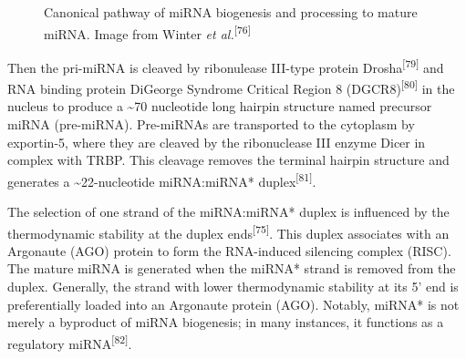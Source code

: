 \documentclass[
  11pt,
  letterpaper,
]{book}
\begin{document}
\begin{figure}[H]


\caption{\label{fig-winter2009many}Canonical pathway of miRNA biogenesis
and processing to mature miRNA. Image from Winter \emph{et
al.}\textsuperscript{{[}76{]}}}

\end{figure}%

Then the pri-miRNA is cleaved by ribonulease III-type protein
Drosha\textsuperscript{{[}79{]}} and RNA binding protein DiGeorge
Syndrome Critical Region 8 (DGCR8)\textsuperscript{{[}80{]}} in the
nucleus to produce a \textasciitilde70 nucleotide long hairpin structure
named precursor miRNA (pre-miRNA). Pre-miRNAs are transported to the
cytoplasm by exportin-5, where they are cleaved by the ribonuclease III
enzyme Dicer in complex with TRBP. This cleavage removes the terminal
hairpin structure and generates a \textasciitilde22-nucleotide
miRNA:miRNA* duplex\textsuperscript{{[}81{]}}.

The selection of one strand of the miRNA:miRNA* duplex is influenced by
the thermodynamic stability at the duplex
ends\textsuperscript{{[}75{]}}. This duplex associates with an Argonaute
(AGO) protein to form the RNA-induced silencing complex (RISC). The
mature miRNA is generated when the miRNA* strand is removed from the
duplex. Generally, the strand with lower thermodynamic stability at its
5' end is preferentially loaded into an Argonaute protein (AGO).
Notably, miRNA* is not merely a byproduct of miRNA biogenesis; in many
instances, it functions as a regulatory miRNA\textsuperscript{{[}82{]}}.
\end{document}
